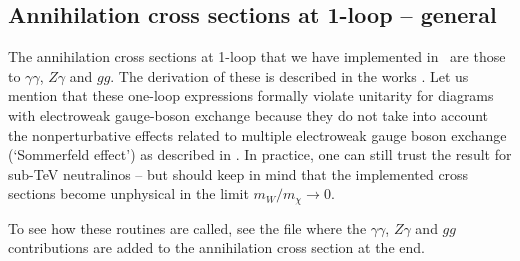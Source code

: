 
\subsection{Annihilation cross sections at 1-loop -- general }

The annihilation cross sections at 1-loop that we have implemented in
\ds\ are those to $\gamma \gamma$, $Z \gamma$ and $g g$. The
derivation of these is described in the works \cite{Bergstrom:1997fh,Ullio:1997ke}.
Let us mention that these one-loop expressions formally violate unitarity for diagrams
with electroweak gauge-boson exchange because they do not take into account the 
nonperturbative effects related to multiple electroweak gauge boson exchange (`Sommerfeld
effect') as described in \cite{Hisano:2003ec,Hisano:2004ds}. In practice, one can still trust 
the result for sub-TeV neutralinos -- but should keep in mind that the implemented cross 
sections become unphysical in the limit $m_W/m_\chi \to 0$.

To see how these routines are called, see the file
 where the $\gamma \gamma$, $Z \gamma$
and $g g$ contributions are added to the annihilation cross section at
the end.
